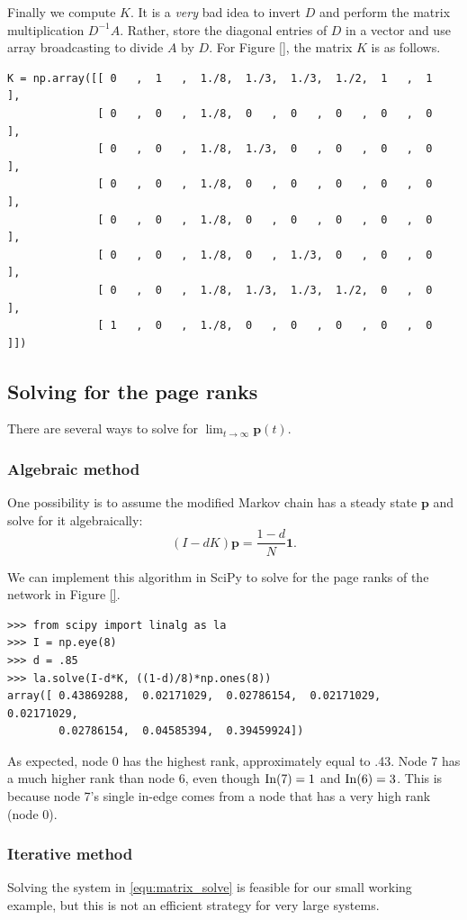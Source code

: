 Finally we compute $K$.
It is a \emph{very} bad idea to invert $D$ and perform the matrix multiplication $D^{-1}A$.
Rather, store the diagonal entries of $D$ in a vector and use array broadcasting to divide $A$ by $D$.
For Figure \ref{}, the matrix $K$ is as follows.

\begin{lstlisting}
K = np.array([[ 0   ,  1   ,  1./8,  1./3,  1./3,  1./2,  1   ,  1   ],
              [ 0   ,  0   ,  1./8,  0   ,  0   ,  0   ,  0   ,  0   ],
              [ 0   ,  0   ,  1./8,  1./3,  0   ,  0   ,  0   ,  0   ],
              [ 0   ,  0   ,  1./8,  0   ,  0   ,  0   ,  0   ,  0   ],
              [ 0   ,  0   ,  1./8,  0   ,  0   ,  0   ,  0   ,  0   ],
              [ 0   ,  0   ,  1./8,  0   ,  1./3,  0   ,  0   ,  0   ],
              [ 0   ,  0   ,  1./8,  1./3,  1./3,  1./2,  0   ,  0   ],
              [ 1   ,  0   ,  1./8,  0   ,  0   ,  0   ,  0   ,  0   ]])
\end{lstlisting}


\subsection*{Solving for the page ranks}
There are several ways to solve for $\lim_{t \to \infty} \mathbf{p}(t)$.
\subsubsection*{Algebraic method}
One possibility is to assume the modified Markov chain has a steady state $\mathbf{p}$ and solve for it algebraically:
\begin{equation}\label{equ:matrix_solve}
(I-dK)\mathbf{p} = \frac{1-d}{N} \mathbf{1}.
\end{equation}

We can implement this algorithm in SciPy to solve for the page ranks of the network in Figure \ref{}.
\begin{lstlisting}
>>> from scipy import linalg as la
>>> I = np.eye(8)
>>> d = .85
>>> la.solve(I-d*K, ((1-d)/8)*np.ones(8))
array([ 0.43869288,  0.02171029,  0.02786154,  0.02171029,  0.02171029,
        0.02786154,  0.04585394,  0.39459924])
\end{lstlisting}
As expected, node 0 has the highest rank, approximately equal to .43. 
Node 7 has a much higher rank than node 6, even though $\operatorname{In}(7)=1$ and $\operatorname{In}(6)=3$. 
This is because node 7's single in-edge comes from a node that has a very high rank (node 0).

\subsubsection*{Iterative method}
Solving the system in \eqref{equ:matrix_solve} is feasible for our small working example, but this is not an efficient strategy for very large systems.


